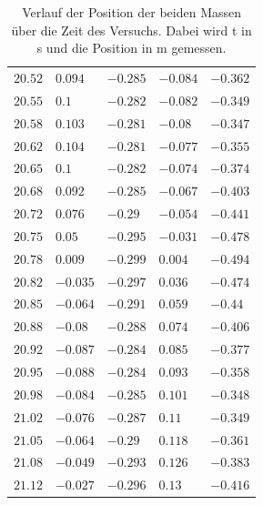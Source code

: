 \begin{table}[h]
\begin{tabular}{rllll}
$20.52$&$0.094$&$-0.285$&$-0.084$&$-0.362$\\
$20.55$&$0.1$&$-0.282$&$-0.082$&$-0.349$\\
$20.58$&$0.103$&$-0.281$&$-0.08$&$-0.347$\\
$20.62$&$0.104$&$-0.281$&$-0.077$&$-0.355$\\
$20.65$&$0.1$&$-0.282$&$-0.074$&$-0.374$\\
$20.68$&$0.092$&$-0.285$&$-0.067$&$-0.403$\\
$20.72$&$0.076$&$-0.29$&$-0.054$&$-0.441$\\
$20.75$&$0.05$&$-0.295$&$-0.031$&$-0.478$\\
$20.78$&$0.009$&$-0.299$&$0.004$&$-0.494$\\
$20.82$&$-0.035$&$-0.297$&$0.036$&$-0.474$\\
$20.85$&$-0.064$&$-0.291$&$0.059$&$-0.44$\\
$20.88$&$-0.08$&$-0.288$&$0.074$&$-0.406$\\
$20.92$&$-0.087$&$-0.284$&$0.085$&$-0.377$\\
$20.95$&$-0.088$&$-0.284$&$0.093$&$-0.358$\\
$20.98$&$-0.084$&$-0.285$&$0.101$&$-0.348$\\
$21.02$&$-0.076$&$-0.287$&$0.11$&$-0.349$\\
$21.05$&$-0.064$&$-0.29$&$0.118$&$-0.361$\\
$21.08$&$-0.049$&$-0.293$&$0.126$&$-0.383$\\
$21.12$&$-0.027$&$-0.296$&$0.13$&$-0.416$\\


\end{tabular}
\normalsize
\caption{Verlauf der Position der beiden Massen über die Zeit des Versuchs. Dabei wird t in s und die Position in m gemessen.}
\label{xy-table}
\end{table}
\nopagebreak
